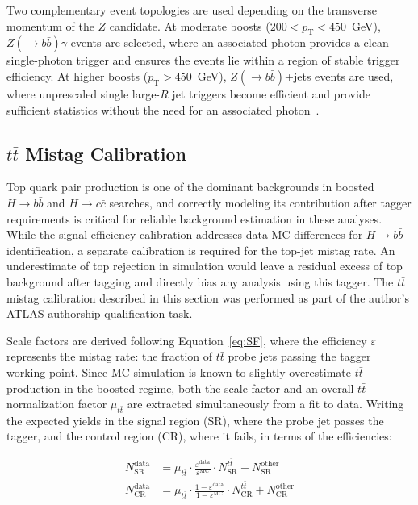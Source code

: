 Two complementary event topologies are used depending on the transverse momentum of the $Z$ candidate. 
At moderate boosts ($200 < p_\text{T} < 450$~GeV), $Z(\rightarrow b\bar{b})\gamma$ events are selected, where an associated photon provides a clean single-photon trigger and ensures the events lie within a region of stable trigger efficiency. 
At higher boosts ($p_\text{T} > 450$~GeV), $Z(\rightarrow b\bar{b})$+jets events are used, where unprescaled single large-$R$ jet triggers become efficient and provide sufficient statistics without the need for an associated photon~\cite{XbbCalib}.

\subsection{\texorpdfstring{$t\bar{t}$}{ttbar} Mistag Calibration}
\label{sec:ttbar_mistag}

Top quark pair production is one of the dominant backgrounds in boosted $H \rightarrow b\bar{b}$ and $H \rightarrow c\bar{c}$ searches, and correctly modeling its contribution after tagger requirements is critical for reliable background estimation in these analyses. 
While the signal efficiency calibration addresses data-MC differences for $H \rightarrow b\bar{b}$ identification, a separate calibration is required for the top-jet mistag rate. 
An underestimate of top rejection in simulation would leave a residual excess of top background after tagging and directly bias any analysis using this tagger.
The $t\bar{t}$ mistag calibration described in this section was performed as part of the author's ATLAS authorship qualification task.

Scale factors are derived following Equation~\ref{eq:SF}, where the efficiency $\varepsilon$ represents the mistag rate: the fraction of $t\bar{t}$ probe jets passing the tagger working point. 
Since MC simulation is known to slightly overestimate $t\bar{t}$ production in the boosted regime, both the scale factor and an overall $t\bar{t}$ normalization factor $\mu_{t\bar{t}}$ are extracted simultaneously from a fit to data.
Writing the expected yields in the signal region (SR), where the probe jet passes the tagger, and the control region (CR), where it fails, in terms of the efficiencies:

\begin{align}
	N^{\text{data}}_{\text{SR}} &= \mu_{t\bar{t}} \cdot \frac{\varepsilon^{\text{data}}}{\varepsilon^{\text{MC}}} \cdot N^{t\bar{t}}_{\text{SR}} + N^{\text{other}}_{\text{SR}} \\
	N^{\text{data}}_{\text{CR}} &= \mu_{t\bar{t}} \cdot \frac{1 - \varepsilon^{\text{data}}}{1 - \varepsilon^{\text{MC}}} \cdot N^{t\bar{t}}_{\text{CR}} + N^{\text{other}}_{\text{CR}}
\end{align}

